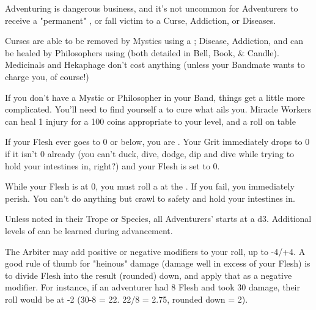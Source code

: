 {  

  Adventuring is dangerous business, and it's not uncommon for Adventurers to receive a "permanent" , or fall victim to a Curse, Addiction, or Diseases.

  Curses are able to be removed by Mystics using a ;  Disease, Addiction, and  can be healed by Philosophers using  (both detailed in Bell, Book, \& Candle).  Medicinals and Hekaphage don't cost anything (unless your Bandmate wants to charge you, of course!)

  If you don't have a Mystic or Philosopher in your Band, things get a little more complicated.  You'll need to find yourself a  to cure what ails you.  Miracle Workers can heal 1 injury for a 100 coins appropriate to your level, and a roll on 
   table




  If your Flesh ever goes to 0 or below, you are .  Your Grit immediately drops to 0 if it isn't 0 already (you can't duck, dive, dodge, dip and dive while trying to hold your intestines in, right?) and your Flesh is set to 0.

  While your Flesh is at 0, you must roll a \DEATH at the .  If you fail, you immediately perish.  You can't do anything but crawl to safety and hold your intestines in.

  Unless noted in their Trope or Species, all Adventurers' \DEATH starts at a d3.  Additional levels of \DEATH can be learned during advancement.



  The Arbiter may add positive or negative modifiers to your roll, up to -4/+4.  A good rule of thumb for "heinous" damage (damage well in excess of your Flesh) is to divide \MAX Flesh into the result (rounded) down, and apply that as a negative modifier.  For instance, if an adventurer had 8 Flesh and took 30 damage, their roll would be at -2 (30-8 = 22.  22/8 = 2.75, rounded down = 2).

}
